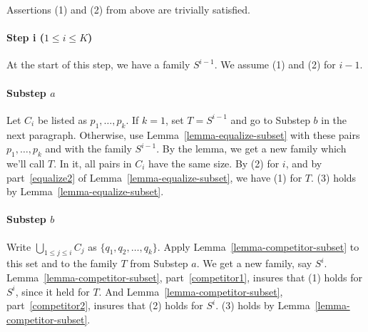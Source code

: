 \documentclass[12pt]{article}
\theoremstyle{definition}
\newcommand{\set}[1]{\{ #1 \}}
\begin{document}
 Assertions (1) and (2) from above are trivially satisfied.
 
 \paragraph{Step i ($1 \leq i \leq K$)}
 At the start of this step, we have a family $S^{i-1}$.
 We assume (1) and (2) for $i -1$.
 
 \paragraph{Substep $a$}
 Let $C_i$ be listed as $p_1, \ldots, p_k$.
 If $k = 1$, set $T = S^{i-1}$ and go to  Substep $b$ in the 
 next paragraph.  Otherwise, 
  use Lemma~\ref{lemma-equalize-subset} with these pairs 
  $p_1, \ldots, p_k$ and with the family
  $S^{i-1}$.
  By the lemma, we get a new family which we'll call $T$.
  In it, all pairs in $C_i$ have the same size.
 By (2) for $i$, and by part~\ref{equalize2} of Lemma~\ref{lemma-equalize-subset},
 we have (1) for $T$.
 (3) holds by  Lemma~\ref{lemma-equalize-subset}.
  
 \paragraph{Substep $b$}  
Write $\bigcup_{1\leq j \leq i} C_j$ as 
$\set{q_1, q_2,\ldots, q_k}$.
Apply Lemma~\ref{lemma-competitor-subset}
to this set and to the family $T$
from Substep $a$.  We get a new family, say 
$S^i$.  
Lemma~\ref{lemma-competitor-subset}, part~\ref{competitor1}, insures that (1) holds for $S^i$, since it held for $T$.
 And Lemma~\ref{lemma-competitor-subset}, part~\ref{competitor2},
 insures that (2) holds for $S^i$.
  (3) holds by  Lemma~\ref{lemma-competitor-subset}.
 
\end{document}
